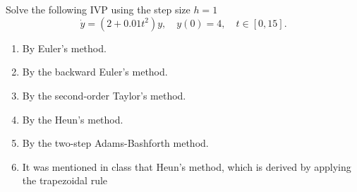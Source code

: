 \section{}
Solve the following IVP using the step size \(h = 1\)
\[ \dot{y}=\left(2+0.01t^2\right)y, \quad y(0)=4, \quad t\in[0,15]. \]
\begin{enumerate}
	\item By Euler's method.
	\item By the backward Euler's method.
	\item  By the second-order Taylor's method.
	\item By the Heun's method.
	\item By the two-step Adams-Bashforth method.
	\item It was mentioned in class that Heun's method, which is derived by applying the trapezoidal rule
\end{enumerate}
